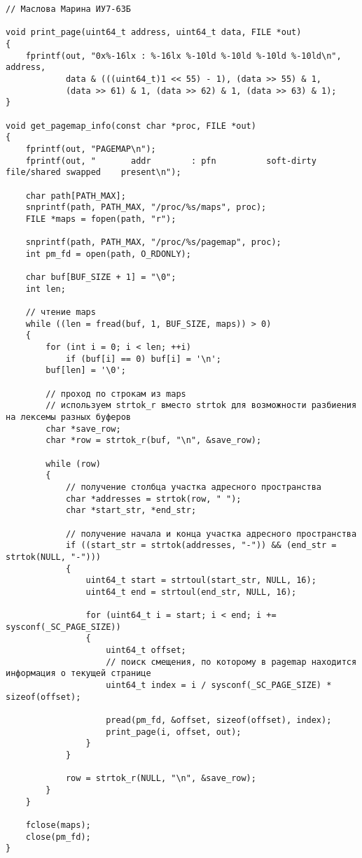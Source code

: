 \documentclass{bmstu}
\begin{document}
\noindent
\begin{minipage}{\linewidth}
\begin{lstlisting}
// Маслова Марина ИУ7-63Б

void print_page(uint64_t address, uint64_t data, FILE *out)
{
    fprintf(out, "0x%-16lx : %-16lx %-10ld %-10ld %-10ld %-10ld\n", address,
            data & (((uint64_t)1 << 55) - 1), (data >> 55) & 1,
            (data >> 61) & 1, (data >> 62) & 1, (data >> 63) & 1);
}

void get_pagemap_info(const char *proc, FILE *out)
{
    fprintf(out, "PAGEMAP\n");
    fprintf(out, "       addr        : pfn          soft-dirty file/shared swapped    present\n");

    char path[PATH_MAX];
    snprintf(path, PATH_MAX, "/proc/%s/maps", proc);
    FILE *maps = fopen(path, "r");

    snprintf(path, PATH_MAX, "/proc/%s/pagemap", proc);
    int pm_fd = open(path, O_RDONLY);

    char buf[BUF_SIZE + 1] = "\0";
    int len;

    // чтение maps
    while ((len = fread(buf, 1, BUF_SIZE, maps)) > 0)
    {
        for (int i = 0; i < len; ++i)
            if (buf[i] == 0) buf[i] = '\n';
        buf[len] = '\0';

        // проход по строкам из maps
        // используем strtok_r вместо strtok для возможности разбиения на лексемы разных буферов
        char *save_row;
        char *row = strtok_r(buf, "\n", &save_row);

        while (row)
        {
            // получение столбца участка адресного пространства
            char *addresses = strtok(row, " ");
            char *start_str, *end_str;
            
            // получение начала и конца участка адресного пространства
            if ((start_str = strtok(addresses, "-")) && (end_str = strtok(NULL, "-")))
            {
                uint64_t start = strtoul(start_str, NULL, 16);
                uint64_t end = strtoul(end_str, NULL, 16);

                for (uint64_t i = start; i < end; i += sysconf(_SC_PAGE_SIZE))
                {
                    uint64_t offset;
                    // поиск смещения, по которому в pagemap находится информация о текущей странице
                    uint64_t index = i / sysconf(_SC_PAGE_SIZE) * sizeof(offset);

                    pread(pm_fd, &offset, sizeof(offset), index);
                    print_page(i, offset, out);
                }
            }

            row = strtok_r(NULL, "\n", &save_row);
        }
    }

    fclose(maps);
    close(pm_fd);
}
\end{lstlisting}
\end{minipage}
\end{document}
